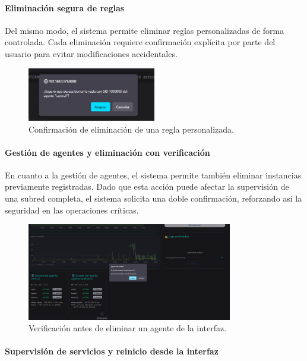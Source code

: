 \documentclass[11pt,a4paper,twoside]{report}
\begin{document}
\paragraph{Eliminación segura de reglas}

Del mismo modo, el sistema permite eliminar reglas personalizadas de forma controlada. Cada eliminación requiere confirmación explícita por parte del usuario para evitar modificaciones accidentales.

\begin{figure}[H]
	\centering
	\includegraphics[width=0.5\textwidth]{pruebas/7.png}
	\caption{Confirmación de eliminación de una regla personalizada.}
	\label{fig:eliminar_regla}
\end{figure}

\paragraph{Gestión de agentes y eliminación con verificación}

En cuanto a la gestión de agentes, el sistema permite también eliminar instancias previamente registradas. Dado que esta acción puede afectar la supervisión de una subred completa, el sistema solicita una doble confirmación, reforzando así la seguridad en las operaciones críticas.

\begin{figure}[H]
	\centering
	\includegraphics[width=0.8\textwidth]{pruebas/8.png}
	\caption{Verificación antes de eliminar un agente de la interfaz.}
	\label{fig:eliminar_agente}
\end{figure}

\paragraph{Supervisión de servicios y reinicio desde la interfaz}
\end{document}
